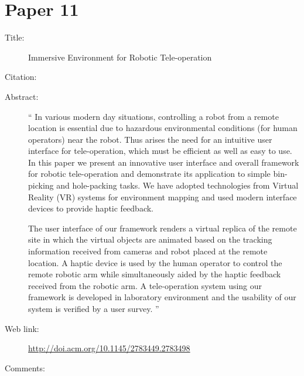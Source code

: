 \documentclass{scrartcl}
\begin{document}
	\section*{Paper 11}
	\begin{description}
		\item[Title:] Immersive Environment for Robotic Tele-operation
		\item[Citation:] \cite{Bugalia}
		\item[Abstract:] ``
		In various modern day situations, controlling a robot from a remote location is essential due to hazardous environmental conditions (for human operators) near the robot. Thus arises the need for an intuitive user interface for tele-operation, which must be efficient as well as easy to use. In this paper we present an innovative user interface and overall framework for robotic tele-operation and demonstrate its application to simple bin-picking and hole-packing tasks. We have adopted technologies from Virtual Reality (VR) systems for environment mapping and used modern interface devices to provide haptic feedback.
		
		The user interface of our framework renders a virtual replica of the remote site in which the virtual objects are animated based on the tracking information received from cameras and robot placed at the remote location. A haptic device is used by the human operator to control the remote robotic arm while simultaneously aided by the haptic feedback received from the robotic arm. A tele-operation system using our framework is developed in laboratory environment and the usability of our system is verified by a user survey.
		''
		\item[Web link:] \url{http://doi.acm.org/10.1145/2783449.2783498}
		\item[Comments:]
	\end{description}

	

											
	
	
											
\end{document}
